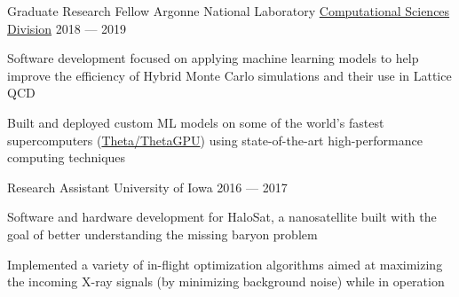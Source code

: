 \begin{cventries}
  \cventry
  {Graduate Research Fellow} %
  {Argonne National Laboratory} %
  {\href{https://www.anl.gov/cps}{\textcolor{awesome}{Computational Sciences Division}}} %
  {2018 --- 2019} %
  {
    \begin{cvitems}%
    \item{Software development focused on applying machine learning models to
      help improve the efficiency of Hybrid Monte Carlo simulations and their
      use in Lattice QCD}
    \item{Built and deployed custom ML models on some of the world's fastest supercomputers
      (\href{https://alcf.anl.gov/support-center/theta-and-thetagpu}{Theta/ThetaGPU}) using state-of-the-art
    high-performance computing techniques}
    \end{cvitems}
  }

  \cventry%
  {Research Assistant} %
  {University of Iowa} %
  {\color{awesome}{Department of Physics \& Astronomy}} %
  {2016 --- 2017} %
  {
  \begin{cvitems}%
    \item{Software and hardware development for HaloSat, a nanosatellite built
      with the goal of better understanding the missing baryon problem}
    \item{Implemented a variety of in-flight optimization algorithms aimed at
      maximizing the incoming X-ray signals (by minimizing background noise)
      while in operation}
  \end{cvitems}%
  }


\end{cventries}
